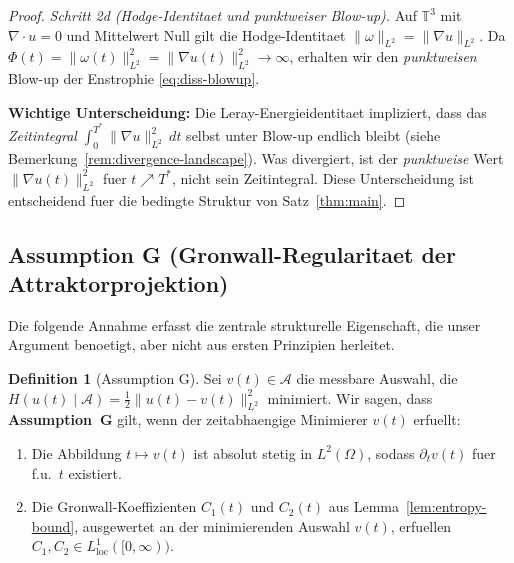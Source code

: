 \documentclass[12pt,a4paper]{article}
\theoremstyle{definition}
\newtheorem{definition}{Definition}[section]
\theoremstyle{plain}
\theoremstyle{remark}
\begin{document}
\begin{proof}
\smallskip
\noindent\emph{Schritt 2d (Hodge-Identitaet und punktweiser Blow-up).}
Auf $\mathbb{T}^3$ mit $\nabla\cdot u = 0$ und Mittelwert Null gilt die Hodge-Identitaet
$\|\omega\|_{L^2} = \|\nabla u\|_{L^2}$.
Da $\Phi(t) = \|\omega(t)\|_{L^2}^2 = \|\nabla u(t)\|_{L^2}^2 \to \infty$,
erhalten wir den \emph{punktweisen} Blow-up der Enstrophie
\eqref{eq:diss-blowup}.

\medskip
\noindent\textbf{Wichtige Unterscheidung:}\;
Die Leray-Energieidentitaet impliziert, dass das \emph{Zeitintegral}
$\int_0^{T^*}\|\nabla u\|_{L^2}^2\,dt$ selbst unter
Blow-up endlich bleibt (siehe Bemerkung~\ref{rem:divergence-landscape}). Was divergiert,
ist der \emph{punktweise} Wert $\|\nabla u(t)\|_{L^2}^2$ fuer
$t \nearrow T^*$, nicht sein Zeitintegral. Diese Unterscheidung ist
entscheidend fuer die bedingte Struktur von Satz~\ref{thm:main}.
\end{proof}

\subsection*{Assumption G (Gronwall-Regularitaet der Attraktorprojektion)}
\label{sec:assumption-G}

Die folgende Annahme erfasst die zentrale strukturelle Eigenschaft, die unser
Argument benoetigt, aber nicht aus ersten Prinzipien herleitet.

\begin{definition}[Assumption G]\label{ass:G}
Sei $v(t) \in \mathcal{A}$ die messbare Auswahl, die
$H(u(t)\mid\mathcal{A}) = \tfrac{1}{2}\|u(t)-v(t)\|_{L^2}^2$ minimiert. Wir sagen,
dass \textbf{Assumption~G} gilt, wenn der zeitabhaengige Minimierer $v(t)$ erfuellt:
\begin{enumerate}
    \item[\emph{(G1)}] Die Abbildung $t \mapsto v(t)$ ist absolut stetig in
          $L^2(\Omega)$, sodass $\partial_t v(t)$ fuer f.u.\ $t$ existiert.
    \item[\emph{(G2)}] Die Gronwall-Koeffizienten $C_1(t)$ und $C_2(t)$ aus
          Lemma~\ref{lem:entropy-bound}, ausgewertet an der minimierenden Auswahl
          $v(t)$, erfuellen $C_1, C_2 \in L^1_{\mathrm{loc}}([0,\infty))$.
\end{enumerate}
\end{definition}
\end{document}
